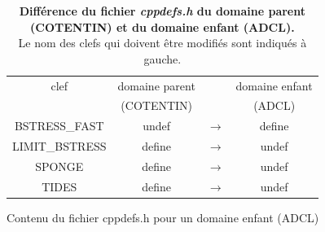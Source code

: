 \documentclass[10pt,a4paper,titlepage]{article}
\begin{document}
\begin{table}[h!]
    \centering
    \caption{
        \textbf{Différence du fichier \textit{cppdefs.h} du domaine parent (COTENTIN) et du domaine enfant (ADCL).}\\
        Le nom des clefs qui doivent être modifiés sont indiqués à gauche.
    }
    \begin{tabular}{c | c c c}
        clef & domaine parent & & domaine enfant  \\
         & (COTENTIN) & & (ADCL) \\
        \hline
        BSTRESS\_FAST & {\color{red}undef} & $\rightarrow$ & {\color{green}define} \\
        \hline
        LIMIT\_BSTRESS & {\color{green}define} & $\rightarrow$ & {\color{red}undef} \\
        \hline
        SPONGE & {\color{green}define} & $\rightarrow$ & {\color{red}undef} \\
        \hline
        TIDES & {\color{green}define} & $\rightarrow$ & {\color{red}undef} \\
    \end{tabular}
    
    \label{table:cppdefs_mere}
\end{table}

\begin{codeEnv}{{Contenu du fichier cppdefs.h pour un domaine enfant (ADCL)\label{codecppdefs}}}
    
\end{codeEnv}
\end{document}
